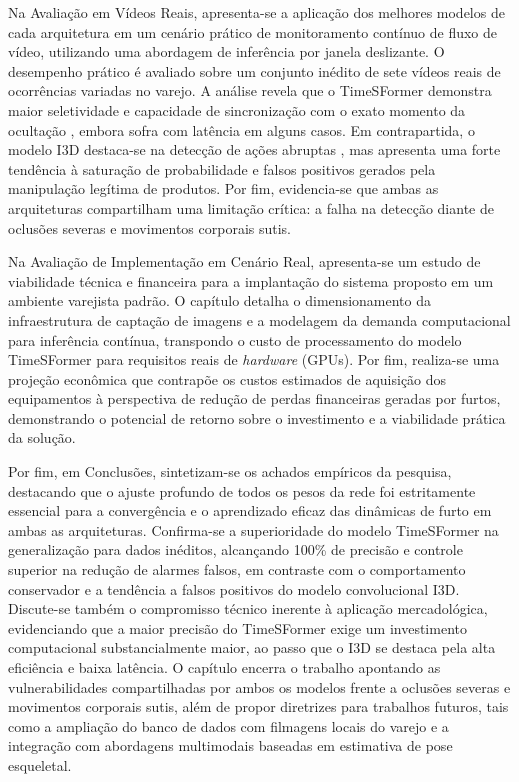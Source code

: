 \documentclass[12pt, %
openright, 
oneside, %
a4paper,    %
brazil]{facom-ufu-abntex2}
\begin{document}
Na Avaliação em Vídeos Reais, apresenta-se a aplicação dos melhores modelos de cada arquitetura em um cenário prático de monitoramento contínuo de fluxo de vídeo, utilizando uma abordagem de inferência por janela deslizante. O desempenho prático é avaliado sobre um conjunto inédito de sete vídeos reais de ocorrências variadas no varejo. A análise revela que o TimeSFormer demonstra maior seletividade e capacidade de sincronização com o exato momento da ocultação , embora sofra com latência em alguns casos. Em contrapartida, o modelo I3D destaca-se na detecção de ações abruptas , mas apresenta uma forte tendência à saturação de probabilidade e falsos positivos gerados pela manipulação legítima de produtos. Por fim, evidencia-se que ambas as arquiteturas compartilham uma limitação crítica: a falha na detecção diante de oclusões severas e movimentos corporais sutis.

Na Avaliação de Implementação em Cenário Real, apresenta-se um estudo de viabilidade técnica e financeira para a implantação do sistema proposto em um ambiente varejista padrão. O capítulo detalha o dimensionamento da infraestrutura de captação de imagens e a modelagem da demanda computacional para inferência contínua, transpondo o custo de processamento do modelo TimeSFormer para requisitos reais de \textit{hardware} (GPUs). Por fim, realiza-se uma projeção econômica que contrapõe os custos estimados de aquisição dos equipamentos à perspectiva de redução de perdas financeiras geradas por furtos, demonstrando o potencial de retorno sobre o investimento e a viabilidade prática da solução.

Por fim, em Conclusões, sintetizam-se os achados empíricos da pesquisa, destacando que o ajuste profundo de todos os pesos da rede foi estritamente essencial para a convergência e o aprendizado eficaz das dinâmicas de furto em ambas as arquiteturas. Confirma-se a superioridade do modelo TimeSFormer na generalização para dados inéditos, alcançando 100\% de precisão e controle superior na redução de alarmes falsos, em contraste com o comportamento conservador e a tendência a falsos positivos do modelo convolucional I3D. Discute-se também o compromisso técnico inerente à aplicação mercadológica, evidenciando que a maior precisão do TimeSFormer exige um investimento computacional substancialmente maior, ao passo que o I3D se destaca pela alta eficiência e baixa latência. O capítulo encerra o trabalho apontando as vulnerabilidades compartilhadas por ambos os modelos frente a oclusões severas e movimentos corporais sutis, além de propor diretrizes para trabalhos futuros, tais como a ampliação do banco de dados com filmagens locais do varejo e a integração com abordagens multimodais baseadas em estimativa de pose esqueletal.
\end{document}
